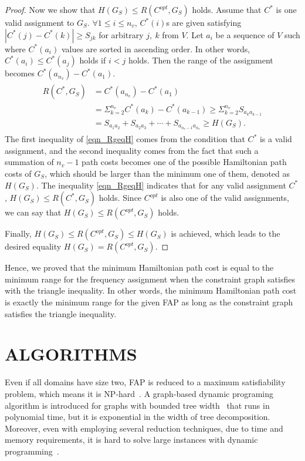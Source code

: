 \documentclass[10pt,twocolumn,twoside]{JCNtran}
\newcommand{\tbirkan}[1]{#1}
\begin{document}
\begin{proof}
Now we show that $H(G_S)\!\leq\!{R(C^{opt},G_S)}$ holds. Assume that $C^{*}$ is one valid assignment to $G_S$. $\forall1\!\leq\!i\!\leq\!n_{v}$, $C^{*}(i)$s are given satisfying $|C^*(j)\!-\!C^*(k)|\!\geq\!{S_{jk}}$ for arbitrary $j,~k$ from $V$. Let $a_i$ be a sequence of $V$ such where $C^{*}(a_i)$ values are sorted in ascending order. In other words, $C^{*}(a_i)\!\leq\!C^{*}(a_j)$ holds if $i\!<\!j$ holds. Then the range of the assignment becomes $C^{*}(a_{n_v})\!-\!C^{*}(a_1)$.
\begin{align}
\begin{split}
\label{eqn_RgeqH}
R(C^{*},G_S)&=C^{*}(a_{n_v})\!-\!C^{*}(a_1) \\
&=\Sigma_{k=2}^{n_v}C^{*}(a_k)\!-\!C^{*}(a_{k\!-\!1})\geq{\Sigma_{k=2}^{n_v}S_{a_{k}a_{k\!-\!1}}} \\
&=S_{a_{1}a_{2}}\!+\!S_{a_{2}a_{3}}\!+\!\cdots\!+\!S_{a_{n_{v}\!-\!1}a_{n_v}}\!\geq\!{H}(G_S).
\end{split}
\end{align}
The first inequality of \eqref{eqn_RgeqH} comes from the condition that $C^*$ is a valid assignment, and the second inequality comes from the fact that such a summation of $n_{v}-1$ path costs becomes one of the possible Hamiltonian path costs of $G_S$, which should be larger than the minimum one of them, denoted as $H(G_S)$. The inequality \eqref{eqn_RgeqH} indicates that for any valid assignment $C^*$, $H(G_S)\!\leq\!{R(C^{*},G_S)}$ holds. Since $C^{opt}$ is also one of the valid assignments, we can say that $H(G_S)\!\leq\!{R(C^{opt},G_S)}$ holds.

Finally, $H(G_S)\!\leq\!{R(C^{opt},G_S)}\!\leq\!H(G_S)$ is achieved, which leads to the desired equality $H(G_S)\!=\!{R(C^{opt},G_S)}$.


\end{proof}

Hence, we proved that the minimum Hamiltonian path cost \tbirkan{is equal to the minimum} range for the frequency assignment when the constraint graph satisfies with the triangle inequality. \tbirkan{In other words, the minimum Hamiltonian path cost is exactly the minimum range for the given FAP as long as the constraint graph satisfies the triangle inequality.} 




\section{\uppercase{Algorithms}}
\label{sec_algorithms}
Even if all domains have size two, FAP is reduced to a maximum satisfiability problem, which means it is NP-hard~\cite{koster1998partialCS}. A graph-based dynamic programing algorithm is introduced for graphs with bounded tree width~\cite{koster1999optimalSF} that runs in polynomial time, but it is exponential in the width of tree decomposition. Moreover, even with employing several reduction techniques, due to time and memory requirements, it is hard to solve large instances with dynamic programming~\cite{koster1999optimalSF}.
\end{document}

